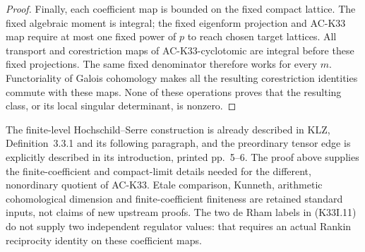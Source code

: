 \begin{proof}
Finally, each coefficient map is bounded on the fixed compact
lattice.  The fixed algebraic moment is integral; the fixed
eigenform projection and AC-K33 map require at most one fixed
power of \(p\) to reach chosen target lattices.  All transport and
corestriction maps of AC-K33-cyclotomic are integral before these
fixed projections.  The same fixed denominator therefore works
for every \(m\).  Functoriality of Galois cohomology makes all the
resulting corestriction identities commute with these maps.
None of these operations proves that the resulting class, or
its local singular determinant, is nonzero.
\end{proof}

\begin{remark}
The finite-level Hochschild--Serre construction is already described
in KLZ, Definition~3.3.1 and its following paragraph, and the
preordinary tensor edge is explicitly described in its introduction,
printed pp.~5--6.  The proof above supplies the finite-coefficient
and compact-limit details needed for the different, nonordinary
quotient of AC-K33.  Etale comparison, Kunneth, arithmetic
cohomological dimension and finite-coefficient finiteness are
retained standard inputs, not claims of new upstream proofs.
The two de Rham labels in (K33I.11) do not supply two independent
regulator values: that requires an actual Rankin reciprocity
identity on these coefficient maps.
\end{remark}
